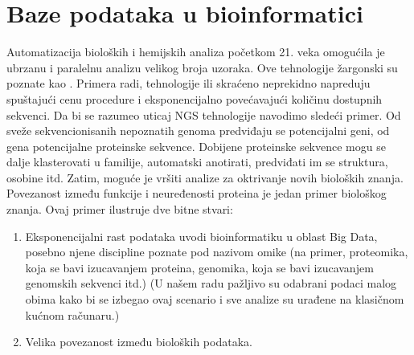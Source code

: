 \chapter{Baze podataka u bioinformatici} %

\label{Baze} %


Automatizacija bioloških i hemijskih analiza početkom 21. veka omogućila je
ubrzanu i paralelnu analizu velikog broja uzoraka. Ove tehnologije žargonski su
poznate kao  . Primera radi, tehnologije 
 ili skraćeno  neprekidno napreduju
spuštajući cenu procedure i eksponencijalno povećavajući količinu dostupnih
sekvenci. Da bi se razumeo uticaj NGS tehnologije navodimo sledeći primer.
Od sveže sekvencionisanih nepoznatih genoma predviđaju se
potencijalni geni, od gena potencijalne proteinske sekvence.  Dobijene
proteinske sekvence mogu se dalje klasterovati u familije, automatski
anotirati, predviđati im se struktura, osobine itd.  Zatim, moguće je vršiti
analize za oktrivanje novih bioloških znanja. Povezanost između funkcije i
neuređenosti proteina je jedan primer biološkog znanja. 
Ovaj primer ilustruje dve bitne stvari:
\begin{enumerate}
  \item Eksponencijalni rast podataka uvodi bioinformatiku u oblast Big Data,
    posebno njene discipline poznate pod nazivom omike (na primer, proteomika,
    koja se bavi izucavanjem proteina, genomika, koja se bavi izucavanjem
    genomskih sekvenci itd.)
  (U našem radu pažljivo su odabrani podaci malog
  obima kako bi se izbegao ovaj scenario i sve analize su urađene na klasičnom
  kućnom računaru.)
  \item Velika povezanost između bioloških podataka.
\end{enumerate}

